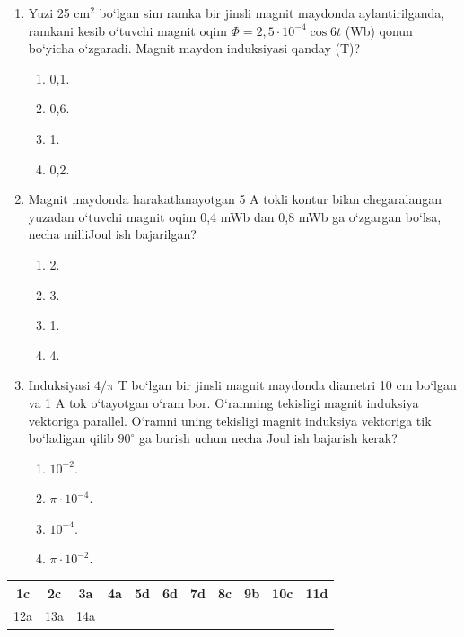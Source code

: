 \begin{enumerate}
\item Yuzi 25 cm$^2$ bo‘lgan sim ramka bir jinsli magnit maydonda aylantirilganda, ramkani kesib o‘tuvchi magnit oqim $\Phi=2,5 \cdot 10^{-4}\cos 6t$ (Wb) qonun bo‘yicha o‘zgaradi. Magnit maydon induksiyasi qanday (T)? 
\begin{enumerate}[label=\Alph*)]
\item 0,1.
\item 0,6.
\item 1.
\item 0,2.
\end{enumerate}

\item Magnit maydonda harakatlanayotgan 5 A tokli kontur bilan chegaralangan yuzadan o‘tuvchi magnit oqim 0,4 mWb dan 0,8 mWb ga o‘zgargan bo‘lsa, necha milliJoul ish bajarilgan?
\begin{enumerate}[label=\Alph*)]
\item 2.
\item 3.
\item 1.
\item 4.
\end{enumerate}

\item Induksiyasi $4/\pi$ T bo‘lgan bir jinsli magnit maydonda diametri 10 cm bo‘lgan va 1 A tok o‘tayotgan o‘ram bor. O‘ramning tekisligi magnit induksiya vektoriga parallel. O‘ramni uning tekisligi magnit induksiya vektoriga tik bo‘ladigan qilib $90^\circ$ ga burish uchun necha Joul ish bajarish kerak? 
\begin{enumerate}[label=\Alph*)]
\item $10^{-2}$.
\item $\pi \cdot 10^{-4}$.
\item $10^{-4}$.
\item $\pi \cdot 10^{-2}$.
\end{enumerate}

\end{enumerate}



\begin{table}[!ht]
\centering
\begin{tabular}{|c|c|c|c|c|c|c|c|c|c|c|}
\hline
1c & 2c & 3a & 4a & 5d & 6d & 7d & 8c & 9b & 10c & 11d \\ \hline
12a & 13a & 14a & & & & & & & & \\ \hline
\end{tabular}
\end{table}


